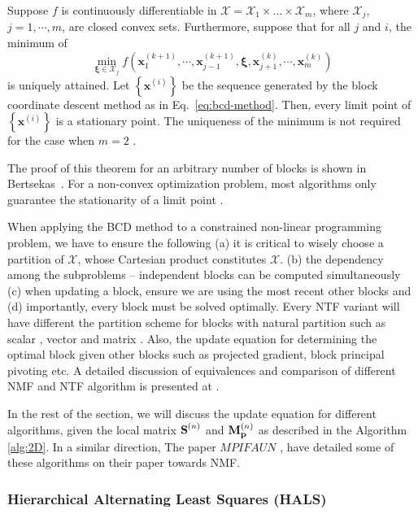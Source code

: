 \begin{theorem}
\label{thm:bcd}
Suppose $f$ is continuously differentiable in $\mathcal{X}=\mathcal{X}_{1}\times\dots\times\mathcal{X}_{m}$,
where $\mathcal{X}_{j}$, $j=1,\cdots,m$, are closed convex sets.
Furthermore, suppose that for all $j$ and $i$, the minimum of
\[
\min_{\mathbf{\mathbf{\xi}}\in\mathcal{X}_{j}}f(\mathbf{x}_{1}^{(k+1)},\cdots,\mathbf{x}_{j-1}^{(k+1)},\mathbf{\xi},\mathbf{x}_{j+1}^{(k)},\cdots,\mathbf{x}_{m}^{(k)})
\]
is uniquely attained. Let $\left\lbrace
\mathbf{x}^{(i)}\right\rbrace $ be the sequence generated by the
block coordinate descent method as in Eq.~\eqref{eq:bcd-method}.
Then, every limit point of $\left\lbrace
\mathbf{x}^{(i)}\right\rbrace $ is a stationary point. The
uniqueness of the minimum is not required for the case when  $m=2$
\cite{GS2000}.
\end{theorem}

The proof of this theorem for an arbitrary number of blocks is shown
in Bertsekas~\cite{Bertsekas1999}.
For a non-convex optimization problem, most algorithms only guarantee
the stationarity of a limit point \cite{Lin2007}.

When applying the BCD method to a constrained non-linear programming
problem, we have to ensure the following (a) it is critical to wisely choose a partition of
$\mathcal{X}$, whose Cartesian product constitutes $\mathcal{X}$. 
(b)  the dependency among the subproblems -- independent blocks can be 
computed simultaneously  (c) when updating a block, ensure we are 
using the most recent other blocks and (d) importantly, every block
must be solved optimally. Every NTF variant will have different the partition
scheme for blocks with natural partition such as scalar \cite{SL2001}, vector \cite{CP2009} and matrix \cite{KP2011}. 
Also, the update equation for determining the optimal block given
other blocks such as projected gradient, block principal pivoting \cite{KP2011}  etc. 
A detailed discussion of equivalences and comparison of different NMF and NTF algorithm
is presented at \cite{KHP2014}. 

In the rest of the section, we will discuss the update equation for different 
algorithms, given the local matrix $\Mn{S}{n}$ and $\Mn{M}{n}_{\V{p}}$ as described in the
Algorithm \ref{alg:2D}. In a similar direction, The paper $MPIFAUN$ \cite{KBP2018}, have detailed some of 
these algorithms on their paper towards NMF.

\subsubsection{Hierarchical Alternating Least Squares (HALS)}
\label{sec:HALS}

